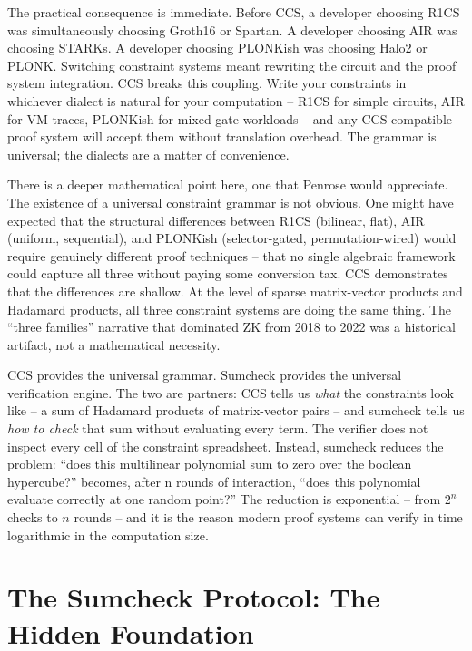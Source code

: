\documentclass[
  11pt,
  openany]{report}
\begin{document}
The practical consequence is immediate. Before CCS, a developer choosing R1CS
was simultaneously choosing Groth16 or Spartan. A developer choosing AIR was
choosing STARKs. A developer choosing PLONKish was choosing Halo2 or PLONK.
Switching constraint systems meant rewriting the circuit and the proof system
integration. CCS breaks this coupling. Write your constraints in whichever
dialect is natural for your computation -- R1CS for simple circuits, AIR for VM
traces, PLONKish for mixed-gate workloads -- and any CCS-compatible proof system
will accept them without translation overhead. The grammar is universal; the
dialects are a matter of convenience.

There is a deeper mathematical point here, one that Penrose would appreciate.
The existence of a universal constraint grammar is not obvious. One might have
expected that the structural differences between R1CS (bilinear, flat), AIR
(uniform, sequential), and PLONKish (selector-gated, permutation-wired) would
require genuinely different proof techniques -- that no single algebraic
framework could capture all three without paying some conversion tax. CCS
demonstrates that the differences are shallow. At the level of sparse
matrix-vector products and Hadamard products, all three constraint systems are
doing the same thing. The ``three families'' narrative that dominated ZK from
2018 to 2022 was a historical artifact, not a mathematical necessity.

CCS provides the universal grammar. Sumcheck provides the universal verification
engine. The two are partners: CCS tells us \emph{what} the constraints look like
-- a sum of Hadamard products of matrix-vector pairs -- and sumcheck tells us
\emph{how to check} that sum without evaluating every term. The verifier does
not inspect every cell of the constraint spreadsheet. Instead, sumcheck reduces
the problem: ``does this multilinear polynomial sum to zero over the boolean
hypercube?'' becomes, after n rounds of interaction, ``does this polynomial
evaluate correctly at one random point?'' The reduction is exponential -- from
\(2^n\) checks to \(n\) rounds -- and it is the reason modern proof systems can
verify in time logarithmic in the computation size.

\section{The Sumcheck Protocol: The Hidden
Foundation}\label{the-sumcheck-protocol-the-hidden-foundation}
\end{document}
